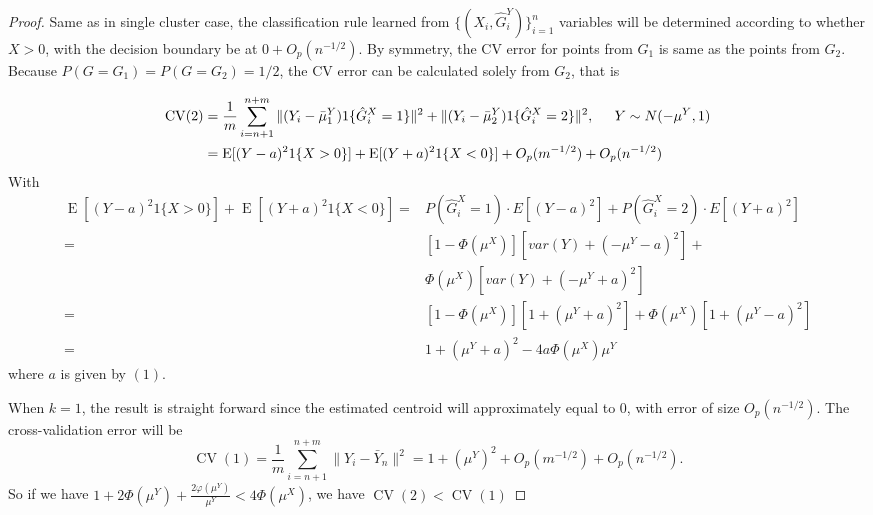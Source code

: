 \documentclass[11pt]{article}
\newcommand{\CV}{\operatorname{CV}}
\newcommand{\E}{\operatorname{E}}
\newcommand{\OhP}{O_p}
\newcommand{\bmuY}{\bar \mu^{Y}}
\newcommand{\hGX}{\hat G^{X}}
\newcommand{\hGY}{\hat G^{Y}}
\begin{document}
\begin{proof}
Same as in single cluster case, the classification rule learned from
$\{(X_i, \hGY_i)\}_{i=1}^{n}$ variables will be determined according to
whether $X > 0$, with the decision boundary be at $0 + \OhP(n^{-1/2})$.
By symmetry, the CV error for points from $G_1$ is same as the points from $G_2$. Because $P(G=G_1) = P(G=G_2) =1/2$, the CV error can be calculated solely from $G_2$, that is

\begin{align*}
  \CV(2)
  &=
    \frac{1}{m}
    \sum_{i=n+1}^{n+m}
      \| (Y_i - \bmuY_1) 1\{\hGX_i = 1\} \|^2
      +
      \| (Y_i - \bmuY_2) 1\{\hGX_i = 2\} \|^2, \hspace{0.2in}Y\sim N(-\mu^Y,1)
\\
  &=
    \E[(Y - a)^2 1\{ X > 0\}] + \E[(Y + a)^2 1\{X < 0\}]
      + \OhP(m^{-1/2}) + \OhP(n^{-1/2})\\
   \end{align*}
   With 
   \begin{align}
 \E[(Y - a)^2 1\{ X > 0\}] + \E[(Y + a)^2 1\{X < 0\}]  =& P(\hGX_i = 1)\cdot E[(Y - a)^2] + P(\hGX_i = 2)\cdot E[(Y + a)^2] \nonumber \\  \nonumber
 =& [1-\Phi(\mu^X)][var(Y)+(-\mu^Y - a)^2]+\\ \nonumber
  & \Phi(\mu^X)[var(Y)+(-\mu^Y + a)^2]\\  \nonumber
  =& [1-\Phi(\mu^X)][1+(\mu^Y + a)^2]+\Phi(\mu^X)[1+(\mu^Y -a )^2]   \\  \nonumber
  =& 1+(\mu^Y + a)^2 -4a\Phi(\mu^X)\mu^Y  \nonumber
\end{align}
where $a$ is given by $(1)$.


When $k=1$, the result is straight forward since the estimated centroid will approximately equal to
$0$, with error of size $\OhP(n^{-1/2})$. The cross-validation error
will be
\[
  \CV(1) = \frac{1}{m} \sum_{i=n+1}^{n+m} \| Y_i - \bar Y_n \|^2
         = 1 + (\mu^Y)^2 + \OhP(m^{-1/2}) + \OhP(n^{-1/2}).
\]
So if we have $1 + 2\Phi(\mu^Y)+ \frac{2\varphi(\mu^Y)}{\mu^Y} < 4\Phi(\mu^X)$, we have $\CV(2) < \CV(1)$
\end{proof}
\end{document}
